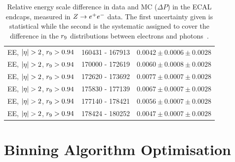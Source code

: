 \begin{table}[hbt]
\begin{tabular}{|c|c|c|}
\hline
EE, $ |\eta| > 2 $, $r_{9} > 0.94$ & 160431 - 167913 & $ 0.0042 \pm 0.0006 \pm 0.0028 $\\
EE, $ |\eta| > 2 $, $r_{9} > 0.94$ & 170000 - 172619 & $ 0.0060 \pm 0.0008 \pm 0.0028 $\\
EE, $ |\eta| > 2 $, $r_{9} > 0.94$ & 172620 - 173692 & $ 0.0077 \pm 0.0007 \pm 0.0028 $\\
EE, $ |\eta| > 2 $, $r_{9} > 0.94$ & 175830 - 177139 & $ 0.0067 \pm 0.0007 \pm 0.0028 $\\
EE, $ |\eta| > 2 $, $r_{9} > 0.94$ & 177140 - 178421 & $ 0.0056 \pm 0.0007 \pm 0.0028 $\\
EE, $ |\eta| > 2 $, $r_{9} > 0.94$ & 178424 - 180252 & $ 0.0047 \pm 0.0007 \pm 0.0028 $\\
\hline
\hline
\end{tabular}
\caption{Relative energy scale difference in data and MC ($\Delta P$) in the ECAL endcaps,
measured in $Z\rightarrow e^{+}e^{-}$ data. 
The first uncertainty given is statistical while the second is the systematic
assigned to cover the difference in the  $r_{9}$ distributions between electrons
and photons~\citep{AN-12-160}.}
\label{tab:escale2011ee}
\end{table}


\clearpage
\section{Binning Algorithm Optimisation}
\label{app:binningalgooptimisation}

